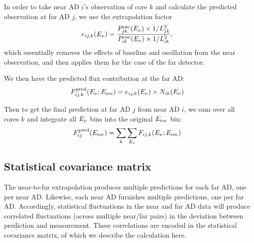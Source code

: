 \documentclass[../thesis.tex]{subfiles}
\begin{document}
In order to take near AD $i$'s observation of core $k$ and calculate the predicted observation at far AD $j$, we use the extrapolation factor
\begin{equation}
  \label{eq:fitExtrapFactor}
  e_{ij,k}(E_\mathrm{\nu}) = \frac{P^{\mathrm{osc}}_{jk}(E_\mathrm{\nu}) \times 1/L^2_{jk}}
  {P^{\mathrm{osc}}_{ik}(E_\mathrm{\nu}) \times 1/L^2_{ik}},
\end{equation}
which essentially removes the effects of baseline and oscillation from the near observation, and then applies them for the case of the far detector.

We then have the predicted flux contribution at the far AD:
\begin{equation}
  F^{\mathrm{pred}}_{ij,k}(E_\mathrm{\nu}; E_\mathrm{rec}) = e_{ij,k}(E_\mathrm{\nu}) \times N_{ik}(E_\mathrm{\nu})
\end{equation}

Then to get the final prediction at far AD $j$ from near AD $i$, we sum over all cores $k$ and integrate all $E_\mathrm{\nu}$ bins into the original $E_\mathrm{rec}$ bin:
\begin{equation}
  \label{eq:FPred}
  F^{\mathrm{pred}}_{ij}(E_\mathrm{rec}) = \sum_k \sum_{E_\mathrm{\nu}} F_{ij,k}(E_\mathrm{\nu}; E_\mathrm{rec})
\end{equation}

\begin{comment}
Near site spectrum divided into Erec bins.

For each bin, convert to true energy using matrix.

For each true energy bin (from this single Erec bin), determine fraction from each core using baselines and power.

For each core, undo 1/L^2 and oscillation, then apply them for each far site

Sum up cores, repeat for all Etrue bins (still for this single Erec bin)

Integrate back into original Erec bin at far site. Repeat for all bins.

In this way we get 16 predictions.
\end{comment}

\subsection{Statistical covariance matrix}
\label{sec:fitStatCovMat}

The near-to-far extrapolation produces multiple predictions for each far AD, one per near AD. Likewise, each near AD furnishes multiple predictions, one per far AD. Accordingly, statistical fluctuations in the near and far AD data will produce correlated fluctuations (across multiple near/far pairs) in the deviation between prediction and measurement. These correlations are encoded in the statistical covariance matrix, of which we describe the calculation here.
\end{document}
